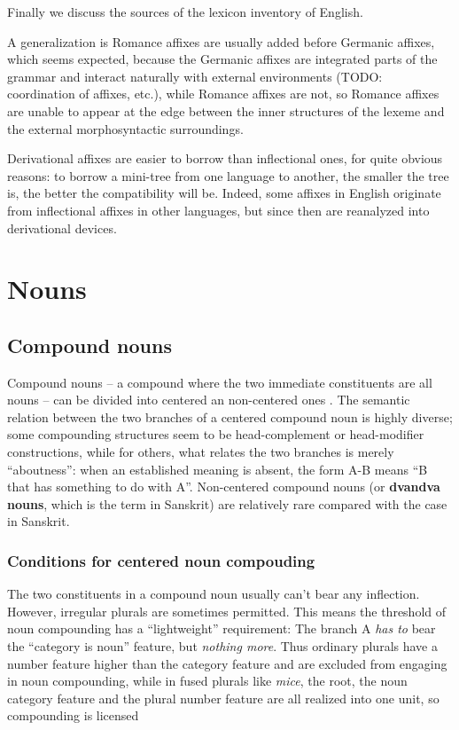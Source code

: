 \documentclass[UTF8, a4paper, oneside, scheme=plain]{ctexrep}
\newcommand*{\citesec}[1]{\S~{#1}}
\newcommand*{\citepages}[1]{pp.~{#1}}
\newcommand*{\concept}[1]{\textbf{#1}}
\newcommand{\corpus}[1]{\emph{#1}}
\begin{document}
Finally we discuss the sources of the lexicon inventory of English.

A generalization is Romance affixes are usually added before Germanic affixes,
which seems expected,
because the Germanic affixes are integrated parts of the grammar 
and interact naturally with external environments
(TODO: coordination of affixes, etc.),
while Romance affixes are not,
so Romance affixes are unable to appear at the edge 
between the inner structures of the lexeme and the external morphosyntactic surroundings.

Derivational affixes are easier to borrow than inflectional ones, 
for quite obvious reasons: 
to borrow a mini-tree from one language to another, 
the smaller the tree is, 
the better the compatibility will be. 
Indeed, some affixes in English originate from inflectional affixes in other languages, 
but since then are reanalyzed into derivational devices.

\section{Nouns}

\subsection{Compound nouns}\label{sec:pos.noun.compound}

Compound nouns -- a compound where the two immediate constituents are all nouns -- 
can be divided into centered an non-centered ones
\citep[\citepages{1646-1648}]{cgel}.
The semantic relation between the two branches of a centered compound noun
is highly diverse; 
some compounding structures seem to be head-complement or head-modifier constructions,
while for others, what relates the two branches is merely ``aboutness'':
when an established meaning is absent,
the form A-B means ``B that has something to do with A''.
Non-centered compound nouns 
(or \concept{dvandva nouns}, which is the term in Sanskrit) 
are relatively rare
compared with the case in Sanskrit.

\subsubsection{Conditions for centered noun compouding}

The two constituents in a compound noun usually can't bear any inflection.
However, irregular plurals are sometimes permitted.
This means the threshold of noun compounding has a ``lightweight'' requirement:
The branch A \emph{has to} bear the ``category is noun'' feature,
but \emph{nothing more}.
Thus ordinary plurals have a number feature higher than the category feature 
and are excluded from engaging in noun compounding,
while in fused plurals like \corpus{mice},
the root, the noun category feature and the plural number feature 
are all realized into one unit,
so compounding is licensed \citep[\citesec{7.1}]{siddiqi2009syntax}
\end{document}
